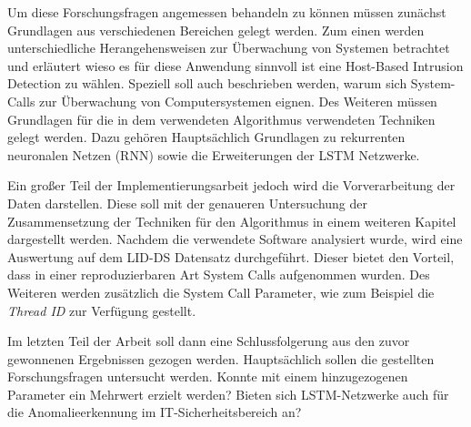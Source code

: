 Um diese Forschungsfragen angemessen behandeln zu können müssen zunächst Grundlagen aus verschiedenen Bereichen gelegt werden.
Zum einen werden unterschiedliche Herangehensweisen zur Überwachung von Systemen betrachtet und erläutert wieso es für diese Anwendung sinnvoll ist eine Host-Based Intrusion Detection zu wählen.
Speziell soll auch beschrieben werden, warum sich System-Calls zur Überwachung von Computersystemen eignen.
Des Weiteren müssen Grundlagen für die in dem verwendeten Algorithmus verwendeten Techniken gelegt werden.
Dazu gehören Hauptsächlich Grundlagen zu rekurrenten neuronalen Netzen (RNN) sowie die Erweiterungen der LSTM Netzwerke.

Ein großer Teil der Implementierungsarbeit jedoch wird die Vorverarbeitung der Daten darstellen.
Diese soll mit der genaueren Untersuchung der Zusammensetzung der Techniken für den Algorithmus in einem weiteren Kapitel dargestellt werden.
Nachdem die verwendete Software analysiert wurde, wird eine Auswertung auf dem LID-DS \cite{LID-DS} Datensatz durchgeführt.
Dieser bietet den Vorteil, dass in einer reproduzierbaren Art System Calls aufgenommen wurden.
Des Weiteren werden zusätzlich die System Call Parameter, wie zum Beispiel die \textit{Thread ID} zur Verfügung gestellt.

Im letzten Teil der Arbeit soll dann eine Schlussfolgerung aus den zuvor gewonnenen Ergebnissen gezogen werden. 
Hauptsächlich sollen die gestellten Forschungsfragen untersucht werden.
Konnte mit einem hinzugezogenen Parameter ein Mehrwert erzielt werden?
Bieten sich LSTM-Netzwerke auch für die Anomalieerkennung im IT-Sicherheitsbereich an?
